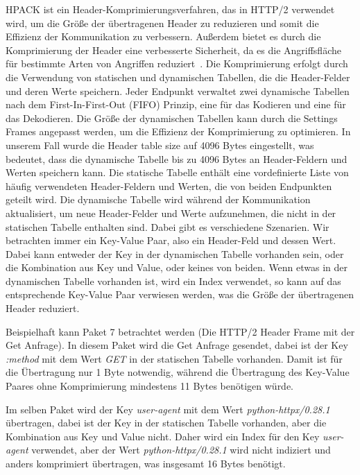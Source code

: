 HPACK ist ein Header-Komprimierungsverfahren, das in HTTP/2 verwendet wird, um die Größe der übertragenen Header zu reduzieren und somit die Effizienz der Kommunikation zu verbessern.
Außerdem bietet es durch die Komprimierung der Header eine verbesserte Sicherheit, da es die Angriffsfläche für bestimmte Arten von Angriffen reduziert~\cite{rfc7541_http2_hpack}.
Die Komprimierung erfolgt durch die Verwendung von statischen und dynamischen Tabellen, die die Header-Felder und deren Werte speichern.
Jeder Endpunkt verwaltet zwei dynamische Tabellen nach dem First-In-First-Out (FIFO) Prinzip, eine für das Kodieren und eine für das Dekodieren.
Die Größe der dynamischen Tabellen kann durch die Settings Frames angepasst werden, um die Effizienz der Komprimierung zu optimieren.
In unserem Fall wurde die Header table size auf 4096 Bytes eingestellt, was bedeutet, dass die dynamische Tabelle bis zu 4096 Bytes an Header-Feldern und Werten speichern kann.
Die statische Tabelle enthält eine vordefinierte Liste von häufig verwendeten Header-Feldern und Werten, die von beiden Endpunkten geteilt wird.
Die dynamische Tabelle wird während der Kommunikation aktualisiert, um neue Header-Felder und Werte aufzunehmen, die nicht in der statischen Tabelle enthalten sind.
Dabei gibt es verschiedene Szenarien.
Wir betrachten immer ein Key-Value Paar, also ein Header-Feld und dessen Wert.
Dabei kann entweder der Key in der dynamischen Tabelle vorhanden sein, oder die Kombination aus Key und Value, oder keines von beiden.
Wenn etwas in der dynamischen Tabelle vorhanden ist, wird ein Index verwendet, so kann auf das entsprechende Key-Value Paar verwiesen werden, was die Größe der übertragenen Header reduziert.~\cite{rfc7541_http2_hpack}

Beispielhaft kann Paket 7 betrachtet werden (Die HTTP/2 Header Frame mit der Get Anfrage).
In diesem Paket wird die Get Anfrage gesendet, dabei ist der Key \textit{:method} mit dem Wert \textit{GET} in der statischen Tabelle vorhanden.
Damit ist für die Übertragung nur 1 Byte notwendig, während die Übertragung des Key-Value Paares ohne Komprimierung mindestens 11 Bytes benötigen würde.

Im selben Paket wird der Key \textit{user-agent} mit dem Wert \textit{python-httpx/0.28.1} übertragen, dabei ist der Key in der statischen Tabelle vorhanden, aber die Kombination aus Key und Value nicht.
Daher wird ein Index für den Key \textit{user-agent} verwendet, aber der Wert \textit{python-httpx/0.28.1} wird nicht indiziert und anders komprimiert übertragen, was insgesamt 16 Bytes benötigt.
